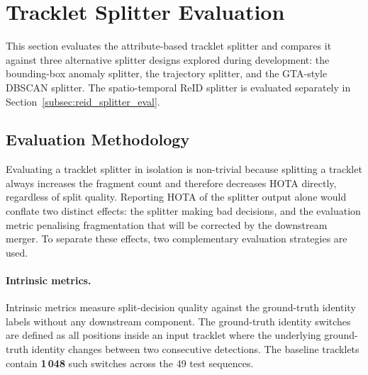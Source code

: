 
\section{Tracklet Splitter Evaluation}\label{sec:splitter_eval}

This section evaluates the attribute-based tracklet splitter and compares it
against three alternative splitter designs explored during development: the
bounding-box anomaly splitter, the trajectory splitter, and the GTA-style
DBSCAN splitter. The spatio-temporal ReID splitter is evaluated separately in
Section~\ref{subsec:reid_splitter_eval}.

\subsection{Evaluation Methodology}\label{subsec:splitter_methodology}

Evaluating a tracklet splitter in isolation is non-trivial because splitting
a tracklet always increases the fragment count and therefore decreases HOTA
directly, regardless of split quality. Reporting HOTA of the splitter output
alone would conflate two distinct effects: the splitter making bad decisions,
and the evaluation metric penalising fragmentation that will be corrected by
the downstream merger. To separate these effects, two complementary evaluation
strategies are used.

\paragraph{Intrinsic metrics.}
Intrinsic metrics measure split-decision quality against the ground-truth
identity labels without any downstream component. The ground-truth identity
switches are defined as all positions inside an input tracklet where the
underlying ground-truth identity changes between two consecutive detections.
The baseline tracklets contain \textbf{1\,048} such switches across the 49
test sequences.

